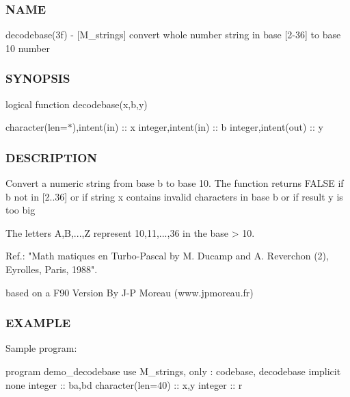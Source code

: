 \subsubsection*{N\+A\+ME}

decodebase(3f) -\/ \mbox{[}M\+\_\+strings\mbox{]} convert whole number string in base \mbox{[}2-\/36\mbox{]} to base 10 number

\subsubsection*{S\+Y\+N\+O\+P\+S\+IS}

logical function decodebase(x,b,y)

character(len=$\ast$),intent(in) \+:\+: x integer,intent(in) \+:\+: b integer,intent(out) \+:\+: y

\subsubsection*{D\+E\+S\+C\+R\+I\+P\+T\+I\+ON}

\begin{DoxyVerb}Convert a numeric string from base b to base 10. The function returns
FALSE if b not in [2..36] or if string x contains invalid
characters in base b or if result y is too big

The letters A,B,...,Z represent 10,11,...,36 in the base > 10.

   Ref.: "Math matiques en Turbo-Pascal by
          M. Ducamp and A. Reverchon (2),
          Eyrolles, Paris, 1988".

based on a F90 Version By J-P Moreau (www.jpmoreau.fr)
\end{DoxyVerb}


\subsubsection*{E\+X\+A\+M\+P\+LE}

Sample program\+:

program demo\+\_\+decodebase use M\+\_\+strings, only \+: codebase, decodebase implicit none integer \+:\+: ba,bd character(len=40) \+:\+: x,y integer \+:\+: r

